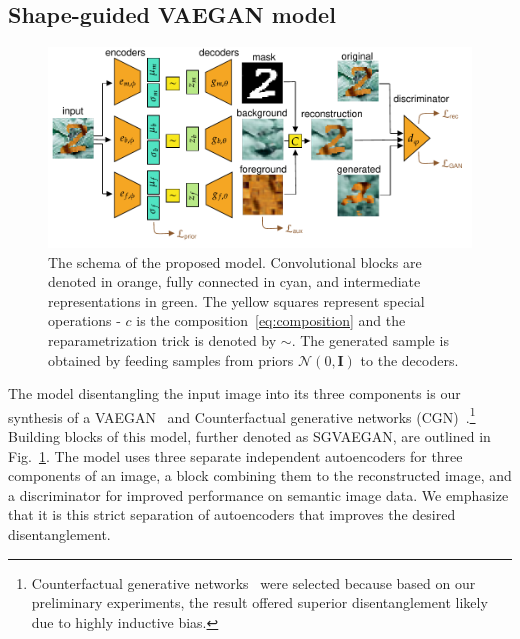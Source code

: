 \subsection{Shape-guided VAEGAN model} \label{sec:sgvaegan}
 \begin{figure}[ht]
    \centering
       \includegraphics[width=\textwidth]{data/chapter_sgvaegan/fig2_sgvaegan_losses.pdf}
    \caption{The schema of the proposed model. Convolutional blocks are denoted in orange, fully connected in cyan, and intermediate representations in green. The yellow squares represent special operations - $c$ is the composition~\eqref{eq:composition} and the reparametrization trick is denoted by $\sim$. The generated sample is obtained by feeding samples from priors $\mathcal{N}(0,\mathbf{I})$ to the decoders.}
    \label{fig:sgvaegan_schema}
\end{figure}

The model disentangling the input image into its three components is our synthesis of a VAEGAN~\cite{larsen2016autoencoding} and Counterfactual generative networks (CGN)~\cite{sauer2021counterfactual}.\footnote{Counterfactual generative networks~\cite{sauer2021counterfactual} were selected because based on our preliminary experiments, the result offered superior disentanglement likely due to highly inductive bias.} Building blocks of this model, further denoted as SGVAEGAN, are outlined in Fig.~\ref{fig:sgvaegan_schema}. The model uses three separate independent autoencoders for three components of an image, a block combining them to the reconstructed image, and a discriminator for improved performance on semantic image data. We emphasize that it is this strict separation of autoencoders that improves the desired disentanglement.

